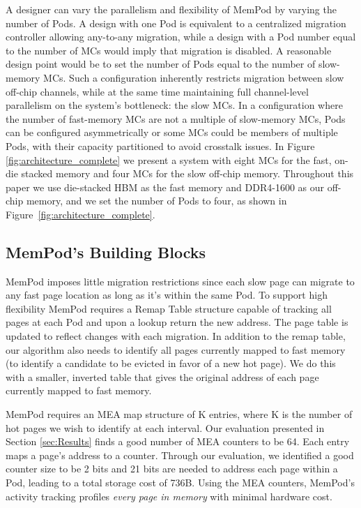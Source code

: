 A designer can vary the parallelism and flexibility of MemPod by varying the
number of Pods. A design with one Pod is equivalent to a centralized 
migration controller allowing any-to-any migration,
while a design with a Pod number equal to the number of MCs would imply that migration is disabled. A reasonable design point would be to set the number of Pods equal to the number of slow-memory MCs. Such a configuration inherently restricts migration between slow off-chip channels, while at the same time maintaining full channel-level parallelism on the system's bottleneck: the slow MCs. In a configuration where the number of fast-memory MCs are not a multiple of slow-memory MCs, Pods can be configured asymmetrically or some MCs could be members of multiple Pods, with their capacity partitioned to avoid crosstalk issues. In Figure \ref{fig:architecture_complete} we present a system with eight MCs for the fast, on-die stacked memory and four MCs for the slow off-chip memory. Throughout this paper we use die-stacked HBM as the fast memory \cite{JEDEC-HBM-REVISED} and DDR4-1600 as our off-chip memory, and 
we set the number of Pods to four, as shown in Figure~\ref{fig:architecture_complete}.

\subsection{MemPod's Building Blocks}

MemPod imposes little migration restrictions since each slow page can migrate to any fast page location as long as it's within the same Pod. To support high flexibility MemPod requires a Remap Table structure capable of tracking all pages at each Pod and upon a lookup return the new address. The page table is updated to reflect changes with each migration. In addition to the remap table, our algorithm also needs to identify all pages currently mapped to fast memory (to identify a candidate to be evicted in favor of a new hot page). We do this with a smaller, inverted table that gives the original address of each page currently mapped to fast memory.

MemPod requires an MEA map structure of K entries, where K is the number of hot pages we wish to identify at each interval. Our evaluation presented in Section \ref{sec:Results} finds a good number of MEA counters to be 64. Each entry maps a page's address to a counter. Through our evaluation, we identified a good counter size to be 2 bits and 21 bits are needed to address each page within a Pod, leading to a total storage cost of 736B. Using the MEA counters, MemPod's activity tracking profiles \textit{every page in memory} with minimal hardware cost. 

